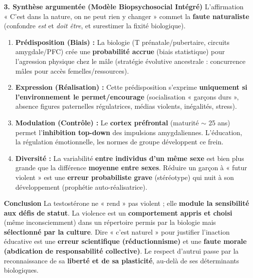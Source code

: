 \documentclass[11pt]{article}
\begin{document}
\begin{exoresolu}
\textbf{3. Synthèse argumentée (Modèle Biopsychosocial Intégré)}
L'affirmation « C'est dans la nature, on ne peut rien y changer » commet la \textbf{faute naturaliste} (confondre \emph{est} et \emph{doit être}, et surestimer la fixité biologique).
\begin{enumerate}
    \item \textbf{Prédisposition (Biais) :} La biologie (T prénatale/pubertaire, circuits amygdale/PFC) crée une \textbf{probabilité accrue} (biais statistique) pour l'agression physique chez le mâle (stratégie évolutive ancestrale : concurrence mâles pour accès femelles/ressources).
    \item \textbf{Expression (Réalisation) :} Cette prédisposition s'exprime \textbf{uniquement si l'environnement le permet/encourage} (socialisation « garçons durs », absence figures paternelles régulatrices, médias violents, inégalités, stress).
    \item \textbf{Modulation (Contrôle) :} Le \textbf{cortex préfrontal} (maturité $\sim$ 25 ans) permet l'\textbf{inhibition top-down} des impulsions amygdaliennes. L'éducation, la régulation émotionnelle, les normes de groupe développent ce frein.
    \item \textbf{Diversité :} La variabilité \textbf{entre individus d'un même sexe} est bien plus grande que la différence \textbf{moyenne entre sexes}. Réduire un garçon à « futur violent » est une \textbf{erreur probabiliste grave} (stéréotype) qui nuit à son développement (prophétie auto-réalisatrice).
\end{enumerate}

\textbf{Conclusion}
La testostérone ne « rend » pas violent ; elle \textbf{module la sensibilité aux défis de statut}. La violence est un \textbf{comportement appris et choisi} (même inconsciemment) dans un répertoire permis par la biologie mais \textbf{sélectionné par la culture}. Dire « c'est naturel » pour justifier l'inaction éducative est une \textbf{erreur scientifique (réductionnisme)} et une \textbf{faute morale (abdication de responsabilité collective)}. Le respect d'autrui passe par la reconnaissance de sa \textbf{liberté et de sa plasticité}, au-delà de ses déterminants biologiques.
\end{exoresolu}
\end{document}

